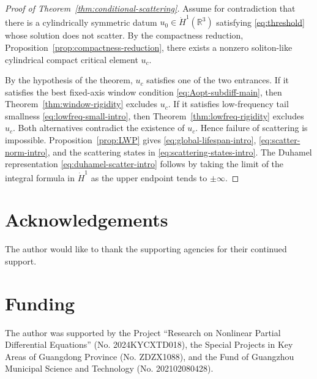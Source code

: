 \documentclass[preprint,12pt]{elsarticle}
\numberwithin{equation}{section}
\newcommand{\R}{\mathbb R}
\theoremstyle{remark}
\begin{document}
\begin{proof}[Proof of Theorem~\ref{thm:conditional-scattering}]
Assume for contradiction that there is a cylindrically symmetric datum $u_0\in\dot H^1(\R^3)$ satisfying \eqref{eq:threshold} whose solution does not scatter.  By the compactness reduction, Proposition~\ref{prop:compactness-reduction}, there exists a nonzero soliton-like cylindrical compact critical element $u_c$.

By the hypothesis of the theorem, $u_c$ satisfies one of the two entrances.  If it satisfies the best fixed-axis window condition \eqref{eq:Aopt-subdiff-main}, then Theorem~\ref{thm:window-rigidity} excludes $u_c$.  If it satisfies low-frequency tail smallness \eqref{eq:lowfreq-small-intro}, then Theorem~\ref{thm:lowfreq-rigidity} excludes $u_c$.  Both alternatives contradict the existence of $u_c$.  Hence failure of scattering is impossible.  Proposition~\ref{prop:LWP} gives \eqref{eq:global-lifespan-intro}, \eqref{eq:scatter-norm-intro}, and the scattering states in \eqref{eq:scattering-states-intro}.  The Duhamel representation \eqref{eq:duhamel-scatter-intro} follows by taking the limit of the integral formula in $\dot H^1$ as the upper endpoint tends to $\pm\infty$.
\end{proof}


\section*{Acknowledgements}
The author would like to thank the supporting agencies for their continued support.


\section*{Funding}
The author was supported by the Project ``Research on Nonlinear Partial Differential Equations'' (No. 2024KYCXTD018), the Special Projects in Key Areas of Guangdong Province (No. ZDZX1088), and the Fund of Guangzhou Municipal Science and Technology (No. 202102080428).
\end{document}
